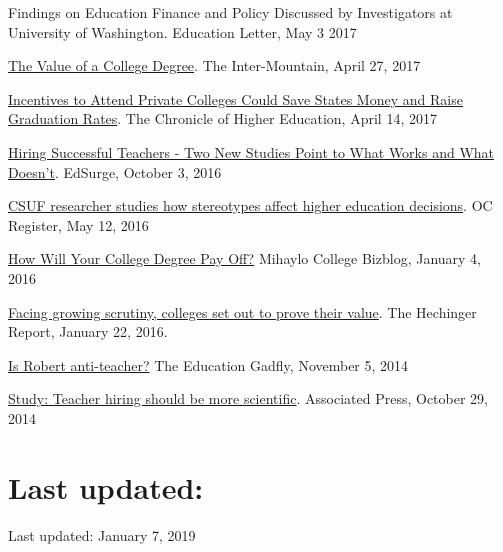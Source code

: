 \documentclass[11pt,a4paper,serif]{moderncv}
\begin{document}
\begin{hangparas}{.25in}{1}
Findings on Education Finance and Policy Discussed by Investigators at University of Washington. Education Letter, May 3 2017



\href{http://www.theintermountain.com/opinion/columnists/2017/04/the-value-of-a-college-degree/}{The Value of a College Degree}. The Inter-Mountain, April 27, 2017



\href{http://www.chronicle.com/article/Incentives-to-Attend-Private/239801?cid=at\&utm_source=at\&utm_medium=en\&elqTrackId=5719cd9ce29549cf9b399520678c52f0\&elq=c46d8f380cc14466861c12899b770d6c\&elqaid=13488\&elqat=1\&elqCampaignId=5599}{Incentives to Attend Private Colleges Could Save States Money and Raise Graduation Rates}. The Chronicle of Higher Education, April 14, 2017



\href{https://www.edsurge.com/news/2016-10-03-hiring-successful-teachers-two-new-studies-point-to-what-works-and-what-doesn-t}{Hiring Successful Teachers - Two New Studies Point to What Works and What Doesn't}. EdSurge, October 3, 2016



\href{http://www.ocregister.com/articles/college-715504-students-klein.html}{CSUF researcher studies how stereotypes affect higher education decisions}. OC Register, May 12, 2016



\href{https://bizblogs.fullerton.edu/blog/2016/01/04/how-will-your-college-degree-pay-off/}{How Will Your College Degree Pay Off?} Mihaylo College Bizblog, January 4, 2016



\href{http://hechingerreport.org/25399-2/}{Facing growing scrutiny, colleges set out to prove their value}. The Hechinger Report, January 22, 2016.



\href{https://edexcellence.net/commentary/podcasts/is-robert-anti-teacher}{Is Robert anti-teacher?} The Education Gadfly, November 5, 2014



\href{http://komonews.com/news/local/study-teacher-hiring-should-be-more-scientific}{Study: Teacher hiring should be more scientific}. Associated Press, October 29, 2014

 
 \end{hangparas}


\section{Last updated:}  
  
Last updated: January 7, 2019

\end{document}
